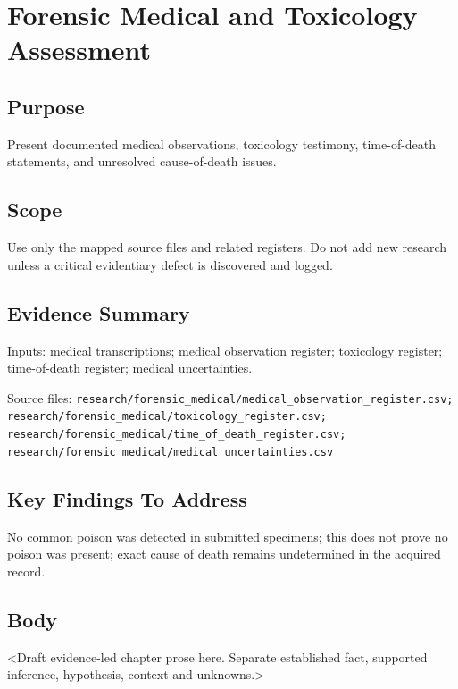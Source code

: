 
\chapter{Forensic Medical and Toxicology Assessment}
\label{chap:06-toxicology}


\section{Purpose}
Present documented medical observations, toxicology testimony, time-of-death statements, and unresolved cause-of-death issues.

\section{Scope}
Use only the mapped source files and related registers. Do not add new research unless a critical evidentiary defect is discovered and logged.

\section{Evidence Summary}
Inputs: medical transcriptions; medical observation register; toxicology register; time-of-death register; medical uncertainties.

Source files: \texttt{research/forensic_medical/medical_observation_register.csv; research/forensic_medical/toxicology_register.csv; research/forensic_medical/time_of_death_register.csv; research/forensic_medical/medical_uncertainties.csv}

\section{Key Findings To Address}
No common poison was detected in submitted specimens; this does not prove no poison was present; exact cause of death remains undetermined in the acquired record.

\section{Body}
<Draft evidence-led chapter prose here. Separate established fact, supported inference, hypothesis, context and unknowns.>

